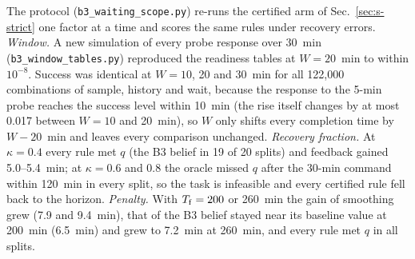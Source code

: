 \documentclass[conference]{IEEEtran}
\begin{document}
\begin{table}[t]
\caption{Recovery errors hidden from the reporter, applied after the 30-min command (spread: both histories). Oracle and model-calibrated columns: median success after the 30-min command over 20 splits (\%); re-certified: splits meeting $q$ for both histories with rules certified on complete plant outcome curves, and the median $\Delta T$ of smoothing against the re-certified fixed waits. Anchored rows fit the single measured mixed probe.}
\label{tab:s-scope-mismatch}
\centering\footnotesize\setlength{\tabcolsep}{3pt}

\end{table}

The protocol (\texttt{b3\_waiting\_scope.py}) re-runs the certified arm of Sec.~\ref{sec:s-strict} one factor at a time and scores the same rules under recovery errors. \emph{Window.} A new simulation of every probe response over 30~min (\texttt{b3\_window\_tables.py}) reproduced the readiness tables at $W=20$~min to within $10^{-8}$. Success was identical at $W=10$, 20 and 30~min for all 122,000 combinations of sample, history and wait, because the response to the 5-min probe reaches the success level within 10~min (the rise itself changes by at most 0.017 between $W=10$ and 20~min), so $W$ only shifts every completion time by $W-20$~min and leaves every comparison unchanged. \emph{Recovery fraction.} At $\kappa=0.4$ every rule met $q$ (the B3 belief in 19 of 20 splits) and feedback gained 5.0--5.4~min; at $\kappa=0.6$ and 0.8 the oracle missed $q$ after the 30-min command within 120~min in every split, so the task is infeasible and every certified rule fell back to the horizon. \emph{Penalty.} With $T_{\rm f}=200$ or 260~min the gain of smoothing grew (7.9 and 9.4~min), that of the B3 belief stayed near its baseline value at 200~min (6.5~min) and grew to 7.2~min at 260~min, and every rule met $q$ in all splits.
\end{document}
